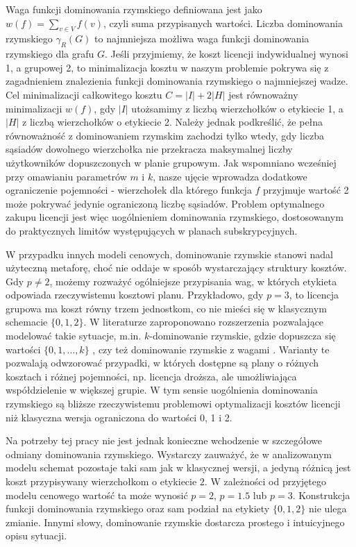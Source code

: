 Waga funkcji dominowania rzymskiego definiowana jest jako $w(f) = \sum_{v \in V} f(v)$, czyli suma przypisanych wartości. Liczba dominowania rzymskiego $\gamma_R(G)$ to najmniejsza możliwa waga funkcji dominowania rzymskiego dla grafu $G$. Jeśli przyjmiemy, że koszt licencji indywidualnej wynosi 1, a grupowej 2, to minimalizacja kosztu w naszym problemie pokrywa się z zagadnieniem znalezienia funkcji dominowania rzymskiego o najmniejszej wadze. Cel minimalizacji całkowitego kosztu $C = |I| + 2|H|$ jest równoważny minimalizacji $w(f)$, gdy $|I|$ utożsamimy z liczbą wierzchołków o etykiecie 1, a $|H|$ z liczbą wierzchołków o etykiecie 2. Należy jednak podkreślić, że pełna równoważność z dominowaniem rzymskim zachodzi tylko wtedy, gdy liczba sąsiadów dowolnego wierzchołka nie przekracza maksymalnej liczby użytkowników dopuszczonych w planie grupowym. Jak wspomniano wcześniej przy omawianiu parametrów $m$ i $k$, nasze ujęcie wprowadza dodatkowe ograniczenie pojemności - wierzchołek dla którego funkcja $f$ przyjmuje wartość 2 może pokrywać jedynie ograniczoną liczbę sąsiadów. Problem optymalnego zakupu licencji jest więc uogólnieniem dominowania rzymskiego, dostosowanym do praktycznych limitów występujących w planach subskrypcyjnych.

W przypadku innych modeli cenowych, dominowanie rzymskie stanowi nadal użyteczną metaforę, choć nie oddaje w sposób wystarczający struktury kosztów. Gdy $p \neq 2$, możemy rozważyć ogólniejsze przypisania wag, w których etykieta odpowiada rzeczywistemu kosztowi planu. Przykładowo, gdy $p=3$, to licencja grupowa ma koszt równy trzem jednostkom, co nie mieści się w klasycznym schemacie $\{0,1,2\}$. W literaturze zaproponowano rozszerzenia pozwalające modelować takie sytuacje, m.in. $k$-dominowanie rzymskie, gdzie dopuszcza się wartości $\{0,1,\dots,k\}$ \cite{CHAUDHARY2024301}, czy też dominowanie rzymskie z wagami \cite{Ghaffari2020}. Warianty te pozwalają odwzorować przypadki, w których dostępne są plany o różnych kosztach i różnej pojemności, np. licencja droższa, ale umożliwiająca współdzielenie w większej grupie. W tym sensie uogólnienia dominowania rzymskiego są bliższe rzeczywistemu problemowi optymalizacji kosztów licencji niż klasyczna wersja ograniczona do wartości 0, 1 i 2.

Na potrzeby tej pracy nie jest jednak konieczne wchodzenie w szczegółowe odmiany dominowania rzymskiego. Wystarczy zauważyć, że w analizowanym modelu schemat pozostaje taki sam jak w klasycznej wersji, a jedyną różnicą jest koszt przypisywany wierzchołkom o etykiecie $2$. W zależności od przyjętego modelu cenowego wartość ta może wynosić $p=2$, $p=1.5$ lub $p=3$. Konstrukcja funkcji dominowania rzymskiego oraz sam podział na etykiety $\{0,1,2\}$ nie ulega zmianie. Innymi słowy, dominowanie rzymskie dostarcza prostego i intuicyjnego opisu sytuacji.

